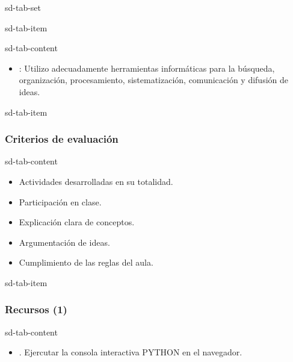 \documentclass[letterpaper,10pt,spanish]{sphinxmanual}
\begin{document}
\begin{sphinxuseclass}{sd-tab-set}
\begin{sphinxuseclass}{sd-tab-item}
\begin{sphinxuseclass}{sd-tab-content}
\begin{itemize}
\item {} 
\sphinxAtStartPar
{}: Utilizo adecuadamente herramientas informáticas para la búsqueda, organización, procesamiento, sistematización, comunicación y difusión de ideas.

\end{itemize}

\end{sphinxuseclass}
\end{sphinxuseclass}
\begin{sphinxuseclass}{sd-tab-item}\subsubsection*{Criterios de evaluación}

\begin{sphinxuseclass}{sd-tab-content}\begin{itemize}
\item {} 
\sphinxAtStartPar
Actividades desarrolladas en su totalidad.

\item {} 
\sphinxAtStartPar
Participación en clase.

\item {} 
\sphinxAtStartPar
Explicación clara de conceptos.

\item {} 
\sphinxAtStartPar
Argumentación de ideas.

\item {} 
\sphinxAtStartPar
Cumplimiento de las reglas del aula.

\end{itemize}

\end{sphinxuseclass}
\end{sphinxuseclass}
\begin{sphinxuseclass}{sd-tab-item}\subsubsection*{Recursos (1)}

\begin{sphinxuseclass}{sd-tab-content}\begin{itemize}
\item {} 
\sphinxAtStartPar
{}. Ejercutar la consola interactiva PYTHON en el navegador.

\end{itemize}

\end{sphinxuseclass}
\end{sphinxuseclass}
\end{sphinxuseclass}
\end{document}
